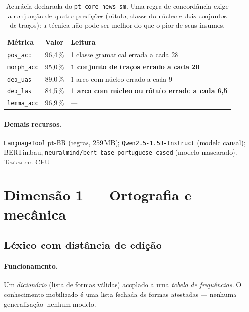 \documentclass[11pt,a4paper]{article}
\newcommand{\dimtable}[1]{\small #1}
\begin{document}
\begin{table}[H]
\centering
\dimtable{
\begin{tabular}{@{}llp{7.4cm}@{}}
\toprule
\textbf{Métrica} & \textbf{Valor} & \textbf{Leitura} \\
\midrule
\texttt{pos\_acc}   & 96,4\,\% & 1 classe gramatical errada a cada 28 \\
\texttt{morph\_acc} & 95,0\,\% & \textbf{1 conjunto de traços errado a cada 20} \\
\texttt{dep\_uas}   & 89,0\,\% & 1 arco com núcleo errado a cada 9 \\
\texttt{dep\_las}   & 84,5\,\% & \textbf{1 arco com núcleo ou rótulo errado a cada 6,5} \\
\texttt{lemma\_acc} & 96,9\,\% & --- \\
\bottomrule
\end{tabular}}
\caption{Acurácia declarada do \texttt{pt\_core\_news\_sm}. Uma regra de concordância exige a
conjunção de quatro predições (rótulo, classe do núcleo e dois conjuntos de traços): a técnica não
pode ser melhor do que o pior de seus insumos.}
\label{tab:spacy}
\end{table}

\paragraph{Demais recursos.} \texttt{LanguageTool} pt-BR (regras, 259\,MB);
\texttt{Qwen2.5-1.5B-Instruct} (modelo causal); BERTimbau,
\texttt{neuralmind/bert-base-portuguese-cased} (modelo mascarado). Testes em CPU.

\section{Dimensão 1 --- Ortografia e mecânica}

\subsection{Léxico com distância de edição}

\paragraph{Funcionamento.} Um \emph{dicionário} (lista de formas válidas) acoplado a uma
\emph{tabela de frequências}. O conhecimento mobilizado é uma lista fechada de formas atestadas ---
nenhuma generalização, nenhum modelo.
\end{document}
